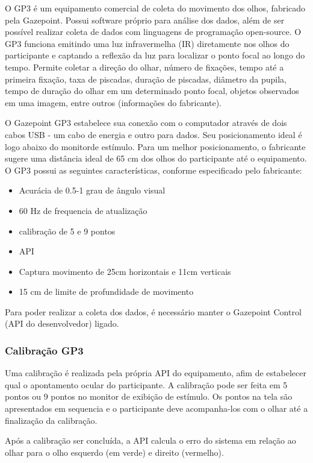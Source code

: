 O GP3 é um equipamento comercial de coleta do movimento dos olhos, 
fabricado pela Gazepoint. Possui software próprio para análise dos dados, 
além de ser possível realizar coleta de dados com linguagens de programação open-source. O GP3 funciona emitindo uma luz infravermelha (IR) 
diretamente nos olhos do participante e captando a reflexão da luz para localizar o ponto focal ao longo do tempo. 
Permite coletar a direção do olhar, número de fixações, tempo até a primeira fixação, taxa de piscadas,
 duração de piscadas, diâmetro da pupila, tempo de duração do olhar em um determinado ponto focal, 
 objetos observados em uma imagem, entre outros (informações do fabricante).

O Gazepoint GP3 estabelece sua conexão com o computador através de dois cabos USB - um cabo de energia e outro para dados.
Seu posicionamento ideal é logo abaixo do monitorde estímulo. Para um melhor posicionamento, o fabricante 
sugere uma distância ideal de 65 cm dos olhos do participante até o equipamento. O GP3 possui as seguintes características, conforme
especificado pelo fabricante:

\begin{itemize}
    \item Acurácia de 0.5-1 grau de ângulo visual
    \item 60 Hz de frequencia de atualização
    \item calibração de 5 e 9 pontos
    \item API
    \item Captura movimento de 25cm horizontais e 11cm verticais
    \item 15 cm de limite de profundidade de movimento
\end{itemize}

Para poder realizar a coleta dos dados, é necessário manter o Gazepoint Control (API do desenvolvedor) ligado. 

\subsubsection{Calibração GP3}
Uma calibração é realizada pela própria API do equipamento, afim de estabelecer qual o apontamento ocular do participante. 
A calibração pode ser feita em 5 pontos ou 9 pontos no monitor de exibição de estímulo. Os pontos na tela são apresentados
em sequencia e o participante deve acompanha-los com o olhar até a finalização da calibração. 

Após a calibração ser concluída, a API calcula o erro do sistema em relação ao olhar para o olho esquerdo (em verde) 
e direito (vermelho). 

